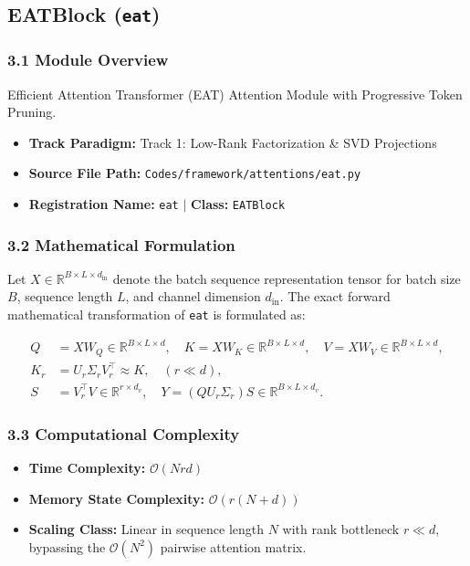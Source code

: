 \subsection{EATBlock (\texttt{eat})}
\label{sec:app_module_eat}

\subsubsection*{3.1 Module Overview}
Efficient Attention Transformer (EAT) Attention Module with Progressive Token Pruning.
\begin{itemize}
    \item \textbf{Track Paradigm:} Track 1: Low-Rank Factorization & SVD Projections
    \item \textbf{Source File Path:} \texttt{Codes/framework/attentions/eat.py}
    \item \textbf{Registration Name:} \texttt{eat} $\mid$ \textbf{Class:} \texttt{EATBlock}
\end{itemize}

\subsubsection*{3.2 Mathematical Formulation}
Let $X \in \mathbb{R}^{B \times L \times d_{\text{in}}}$ denote the batch sequence representation tensor for batch size $B$, sequence length $L$, and channel dimension $d_{\text{in}}$. The exact forward mathematical transformation of \texttt{eat} is formulated as:

\begin{align}
Q &= X W_Q \in \mathbb{R}^{B \times L \times d}, \quad K = X W_K \in \mathbb{R}^{B \times L \times d}, \quad V = X W_V \in \mathbb{R}^{B \times L \times d}, \\
K_r &= U_r \Sigma_r V_r^\top \approx K, \quad (r \ll d), \\
S &= V_r^\top V \in \mathbb{R}^{r \times d_v}, \quad Y = (Q U_r \Sigma_r) S \in \mathbb{R}^{B \times L \times d_v}.
\end{align}


\subsubsection*{3.3 Computational Complexity}
\begin{itemize}
    \item \textbf{Time Complexity:} $\mathcal{O}(N r d)$
    \item \textbf{Memory State Complexity:} $\mathcal{O}(r(N + d))$
    \item \textbf{Scaling Class:} Linear in sequence length $N$ with rank bottleneck $r \ll d$, bypassing the $\mathcal{O}(N^2)$ pairwise attention matrix.
\end{itemize}

